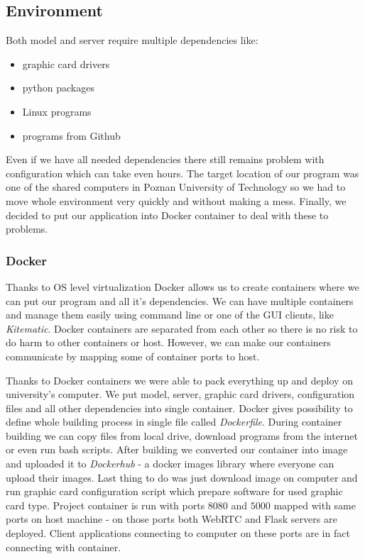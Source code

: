 \documentclass[../Main.tex]{subfiles}
\begin{document}
\subsection{Environment}
    Both model and server require multiple dependencies like:
    \begin{itemize}
        \item graphic card drivers
        \item python packages 
        \item Linux programs
        \item programs from Github
    \end{itemize}
    Even if we have all needed dependencies there still remains problem with configuration which can take even hours. The target location of our program was one of the shared computers in Poznan University of Technology so we had to move whole environment very quickly and without making a mess. 
    Finally, we decided to put our application into Docker container to deal with these to problems.
    
    \subsubsection{Docker}
    Thanks to OS level virtualization Docker allows us to create containers where we can put our program and all it's dependencies. We can have multiple containers and manage them easily using command line or one of the GUI clients, like \textit{Kitematic}. Docker containers are separated from each other so there is no risk to do harm to other containers or host. However, we can make our containers communicate by mapping some of container ports to host.
    
    Thanks to Docker containers we were able to pack everything up and deploy on university's computer.
    We put model, server, graphic card drivers, configuration files and all other dependencies into single container. Docker gives possibility to define whole building process in single file called \textit{Dockerfile}. During container building we can copy files from local drive, download programs from the internet or even run bash scripts. 
    After building we converted our container into image and uploaded it to \textit{Dockerhub} - a docker images library where everyone can upload their images. Last thing to do was just download image on computer and run graphic card configuration script which prepare software for used graphic card type.
    Project container is run with ports $8080$ and $5000$ mapped with same ports on host machine - on those ports both WebRTC and Flask servers are deployed. Client applications connecting to computer on these ports are in fact connecting with container.
    
\end{document}
